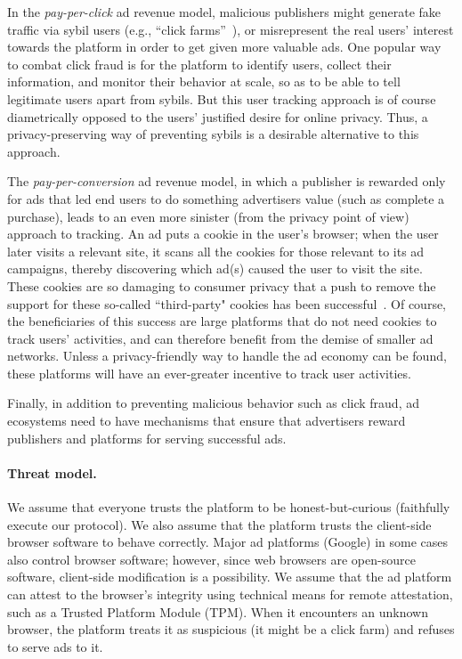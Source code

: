 %
%
%
In the \emph{pay-per-click} ad revenue model, malicious publishers might generate fake traffic via sybil users (e.g., ``click
farms''~\cite{understanding-ad-fraud}), or misrepresent the real users' interest
towards the platform in order to get given more valuable ads.
%
One popular way to combat click fraud is for the platform to identify users,
collect their information, and monitor their behavior at scale, so as to be able to tell legitimate users apart from sybils.
%
But this user tracking approach is of course diametrically opposed to the users' justified desire for online
privacy.
%
Thus, a privacy-preserving way of preventing sybils is a desirable alternative to this approach.
%

%
The \emph{pay-per-conversion} ad revenue model, in which a publisher is rewarded only for ads that led end users to do something advertisers value (such as complete a purchase), leads to an even more sinister (from the privacy point of view) approach to tracking.
%
An ad puts a cookie in the user's browser; when the user later visits a relevant site, it scans all the cookies for those relevant to its ad campaigns, thereby discovering which ad(s) caused the user to visit the site.
%
These cookies are so damaging to consumer privacy that a push to remove the support for these so-called ``third-party" cookies has been successful~\cite{consumerreports-3rd-party-cookies}.
%
Of course, the beneficiaries of this success are large platforms that do not need cookies to track users' activities, and can therefore benefit from the demise of smaller ad networks.
%
Unless a privacy-friendly way to handle the ad economy can be found, these platforms will have an ever-greater incentive to track user activities.
%

%
Finally, in addition to preventing malicious behavior such as click fraud, ad ecosystems need to have mechanisms that ensure that advertisers reward publishers and platforms for serving successful ads.  
%

\paragraph{Threat model.}
%
We assume that everyone trusts the platform to be honest-but-curious (\ie faithfully execute our protocol). 
%
We also assume that the platform trusts the client-side browser software to behave correctly.
%
Major ad platforms (\eg Google) in some cases also control browser software; however, since web browsers are open-source software, client-side modification is a possibility.
%
We assume that the ad platform can attest to the browser's integrity using technical means for remote attestation, such as a Trusted Platform Module (TPM).
%
When it encounters an unknown browser, the platform treats it as suspicious (\ie it might be a click farm) and refuses to serve ads to it.
%

